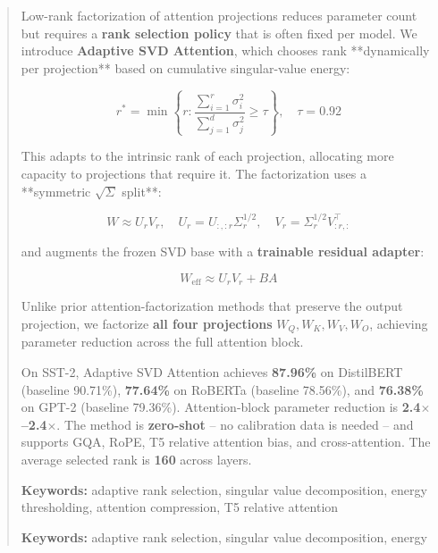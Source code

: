 \documentclass[10pt,twocolumn,letterpaper]{article}
\begin{document}
\maketitle

\begin{abstract}
Low-rank factorization of attention projections reduces parameter count but 
requires a \textbf{rank selection policy} that is often fixed per model. We 
introduce \textbf{Adaptive SVD Attention}, which chooses rank **dynamically 
per projection** based on cumulative singular-value energy:

\[
r^* = \min\left\{ r : \frac{\sum_{i=1}^{r} \sigma_i^2}{\sum_{j=1}^{d} \sigma_j^2} \geq \tau \right\}, \quad \tau = 0.92
\]

This adapts to the intrinsic rank of each projection, allocating more 
capacity to projections that require it. The factorization uses a **symmetric 
$\sqrt{\Sigma}$ split**:

\[
W \approx U_r V_r, \quad U_r = U_{:, :r} \Sigma_r^{1/2}, \quad V_r = \Sigma_r^{1/2} V_{:r, :}^\top
\]

and augments the frozen SVD base with a \textbf{trainable residual adapter}:

\[
W_\text{eff} \approx U_r V_r + B A
\]

Unlike prior attention-factorization methods that preserve the output 
projection, we factorize \textbf{all four projections} $W_Q, W_K, W_V, W_O$, 
achieving parameter reduction across the full attention block.

On SST-2, Adaptive SVD Attention achieves \textbf{87.96\%} on DistilBERT 
(baseline 90.71\%), \textbf{77.64\%} on RoBERTa (baseline 78.56\%), 
and \textbf{76.38\%} on GPT-2 (baseline 79.36\%). Attention-block parameter 
reduction is \textbf{2.4$\times$--2.4$\times$}. The method is \textbf{zero-shot} -- no 
calibration data is needed -- and supports GQA, RoPE, T5 relative attention 
bias, and cross-attention. The average selected rank is \textbf{160} 
across layers.

\textbf{Keywords:} adaptive rank selection, singular value decomposition, energy 
thresholding, attention compression, T5 relative attention



\vspace{0.5em}
\noindent\textbf{Keywords:} adaptive rank selection, singular value decomposition, energy
\end{abstract}

\vspace{1em}
\end{document}
